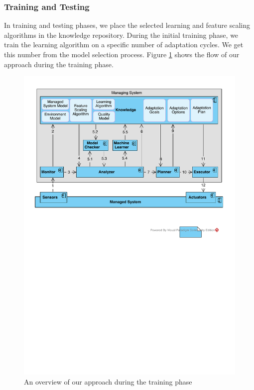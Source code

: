 \documentclass[a4paper,12pt]{article}
\begin{document}
\subsubsection{Training and Testing} \label{TrainingAndTesting}
In training and testing phases, we place the selected learning and feature scaling algorithms in the knowledge repository. During the initial training phase, we train the learning algorithm on a specific number of adaptation cycles. We get this number from the model selection process. Figure \ref{TrainingView} shows the flow of our approach during the training phase.
\begin{figure}[H]
	\centering
	\includegraphics[keepaspectratio, width=\linewidth]{figures/TrainingView.pdf}
	\caption{An overview of our approach during the training phase}
	\label{TrainingView}
\end{figure}
\end{document}
